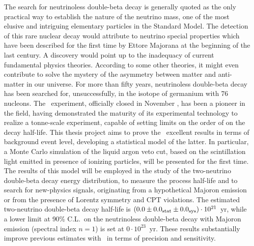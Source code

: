 
The search for neutrinoless double-beta decay is generally quoted as the only
practical way to establish the nature of the neutrino mass, one of the most
elusive and intriguing elementary particles in the Standard Model. The detection
of this rare nuclear decay would attribute to neutrino special properties which
have been described for the first time by Ettore Majorana at the beginning of
the last century. A discovery would point up to the inadequacy of current
fundamental physics theories. According to some other theories, it might even
contribute to solve the mystery of the asymmetry between matter and anti-matter
in our universe. For more than fifty years, neutrinoless double-beta decay has
been searched for, unsuccessfully, in the isotope of germanium with 76 nucleons.
The \gerda\ experiment, officially closed in November , has been a
pioneer in the field, having demonstrated the maturity of its experimental
technology to realize a tonne-scale experiment, capable of setting limits on the
order of  on the decay half-life. This thesis project aims to prove
the \gerda\ excellent results in terms of background event level, developing a
statistical model of the latter. In particular, a Monte Carlo simulation of the
liquid argon veto cut, based on the scintillation light emitted in presence of
ionizing particles, will be presented for the first time. The results of this
model will be employed in the study of the two-neutrino double-beta decay energy
distribution, to measure the process half-life and to search for new-physics
signals, originating from a hypothetical Majoron emission or from the presence
of Lorentz symmetry and CPT violations. The estimated two-neutrino double-beta
decay half-life is $(0.0 \pm {0.0}_\text{stat} \pm {0.0}_\text{sys}) \cdot 10^{21}$~yr, while
a lower limit at 90\% C.L.~on the neutrinoless double-beta decay with Majoron
emission (spectral index $n=1$) is set at $0 \cdot 10^{23}$~yr. These results
substantially improve previous estimates with \gesix\ in terms of precision and
sensitivity.

